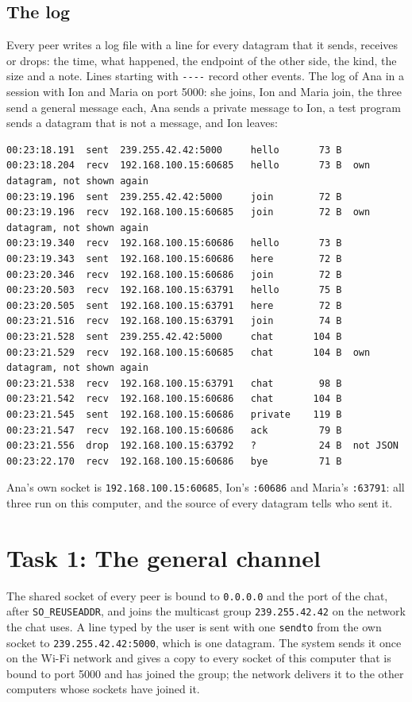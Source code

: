 \documentclass[11pt,a4paper]{article}
\newcommand{\code}[1]{{\frenchspacing\texttt{#1}}}
\begin{document}
\subsection{The log}

Every peer writes a log file with a line for every datagram that it sends, receives or drops: the
time, what happened, the endpoint of the other side, the kind, the size and a note. Lines starting
with \code{-{}-{}-{}-} record other events. The log of Ana in a session with Ion and Maria on port 5000:
she joins, Ion and Maria join, the three send a general message each, Ana sends a private message
to Ion, a test program sends a datagram that is not a message, and Ion leaves:

\begin{lstlisting}
00:23:18.191  sent  239.255.42.42:5000     hello       73 B
00:23:18.204  recv  192.168.100.15:60685   hello       73 B  own datagram, not shown again
00:23:19.196  sent  239.255.42.42:5000     join        72 B
00:23:19.196  recv  192.168.100.15:60685   join        72 B  own datagram, not shown again
00:23:19.340  recv  192.168.100.15:60686   hello       73 B
00:23:19.343  sent  192.168.100.15:60686   here        72 B
00:23:20.346  recv  192.168.100.15:60686   join        72 B
00:23:20.503  recv  192.168.100.15:63791   hello       75 B
00:23:20.505  sent  192.168.100.15:63791   here        72 B
00:23:21.516  recv  192.168.100.15:63791   join        74 B
00:23:21.528  sent  239.255.42.42:5000     chat       104 B
00:23:21.529  recv  192.168.100.15:60685   chat       104 B  own datagram, not shown again
00:23:21.538  recv  192.168.100.15:63791   chat        98 B
00:23:21.542  recv  192.168.100.15:60686   chat       104 B
00:23:21.545  sent  192.168.100.15:60686   private    119 B
00:23:21.547  recv  192.168.100.15:60686   ack         79 B
00:23:21.556  drop  192.168.100.15:63792   ?           24 B  not JSON
00:23:22.170  recv  192.168.100.15:60686   bye         71 B
\end{lstlisting}

Ana's own socket is \code{192.168.100.15:60685}, Ion's \code{:60686} and Maria's \code{:63791}: all
three run on this computer, and the source of every datagram tells who sent it.

\section{Task 1: The general channel}\label{sec:task1}

The shared socket of every peer is bound to \code{0.0.0.0} and the port of the chat, after
\code{SO\_REUSEADDR}, and joins the multicast group \code{239.255.42.42} on the network the chat
uses. A line typed by the user is sent with one \code{sendto} from the own socket to
\code{239.255.42.42:5000}, which is one datagram. The system sends it once on the Wi-Fi network and
gives a copy to every socket of this computer that is bound to port 5000 and has joined the group;
the network delivers it to the other computers whose sockets have joined it.
\end{document}
